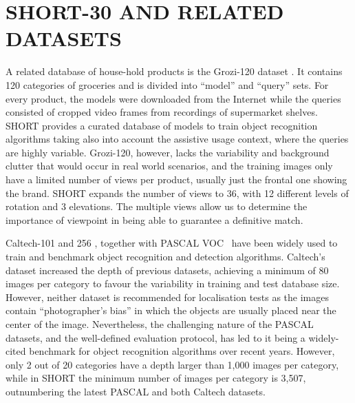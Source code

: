 \section{SHORT-30 AND RELATED DATASETS} \label{sec:related-work}


A related database of house-hold products is the Grozi-120 dataset \cite{Merler2007}. It contains 120 categories of groceries and is divided into ``model'' and ``query'' sets. For every product, the models were downloaded from the Internet while the queries consisted of cropped video frames from recordings of supermarket shelves. SHORT provides a curated database of models to train object recognition algorithms taking also into account the assistive usage context, where the queries are highly variable. Grozi-120, however, lacks the variability and background clutter that would occur in real world scenarios, and the training images only have a limited number of views per product, usually just the frontal one showing the brand. SHORT expands the number of views to 36, with 12 different levels of rotation and 3 elevations.  The multiple views allow us to determine the importance of viewpoint in being able to guarantee a definitive match. 

Caltech-101 and 256 \cite{Feifei2007,Griffin2007}, together with PASCAL VOC~\cite{Everingham2009} have been widely used to train and benchmark object recognition and detection algorithms. Caltech's dataset increased the depth of previous datasets, achieving a minimum of 80 images per category to favour the variability in training and test database size. However, neither dataset is recommended for localisation tests as the images contain ``photographer's bias'' in which the objects are usually placed near the center of the image. Nevertheless, the challenging nature of the PASCAL datasets, and the well-defined evaluation protocol, has led to it being a widely-cited benchmark for object recognition algorithms over recent years. However, only 2 out of 20 categories have a depth larger than 1,000 images per category, while in SHORT the minimum number of images per category is 3,507, outnumbering the latest PASCAL and both Caltech datasets.
 
